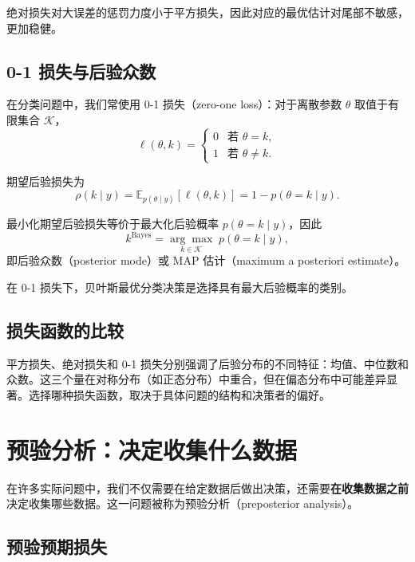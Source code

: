 绝对损失对大误差的惩罚力度小于平方损失，因此对应的最优估计对尾部不敏感，更加稳健。

\subsection{0-1 损失与后验众数}

在分类问题中，我们常使用 0-1 损失（zero-one loss）：对于离散参数 $\theta$ 取值于有限集合 $\mathcal{K}$，
\[
\ell(\theta, k) = \begin{cases}
  0 & \text{若 } \theta = k, \\
  1 & \text{若 } \theta \neq k.
\end{cases}
\]

期望后验损失为
\[
\rho(k \mid y) = \mathbb{E}_{p(\theta\mid y)}[\ell(\theta, k)] = 1 - p(\theta = k \mid y).
\]

最小化期望后验损失等价于最大化后验概率 $p(\theta = k \mid y)$，因此
\[
k^{\text{Bayes}} = \underset{k \in \mathcal{K}}{\arg\max} \; p(\theta = k \mid y),
\]
即后验众数（posterior mode）或 MAP 估计（maximum a posteriori estimate）。

\begin{Theorem}[0-1 损失下的贝叶斯最优分类]\label{th:zero-one-loss-bayes}
  在 0-1 损失下，贝叶斯最优分类决策是选择具有最大后验概率的类别。
\end{Theorem}

\subsection{损失函数的比较}

\begin{Remark}
  平方损失、绝对损失和 0-1 损失分别强调了后验分布的不同特征：均值、中位数和众数。这三个量在对称分布（如正态分布）中重合，但在偏态分布中可能差异显著。选择哪种损失函数，取决于具体问题的结构和决策者的偏好。
\end{Remark}

\section{预验分析：决定收集什么数据}

在许多实际问题中，我们不仅需要在给定数据后做出决策，还需要\textbf{在收集数据之前}决定收集哪些数据。这一问题被称为预验分析（preposterior analysis）。

\subsection{预验预期损失}

